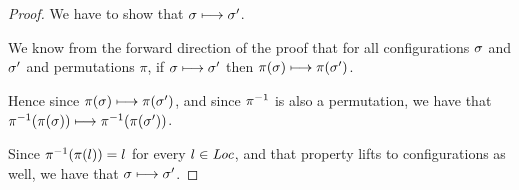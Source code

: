 \begin{proof}
  We have to show that $\sigma \longmapsto \sigma'$.

  We know from the forward direction of the proof that for all
  configurations $\sigma$ and $\sigma'$ and permutations $\pi$, if
  $\sigma \longmapsto \sigma'$ then $\pi(\sigma) \longmapsto
  \pi(\sigma')$.

  Hence since $\pi(\sigma) \longmapsto \pi(\sigma')$, and since $\pi^{-1}$
  is also a permutation, we have that $\pi^{-1}(\pi(\sigma)) \longmapsto
  \pi^{-1}(\pi(\sigma'))$.

  Since $\pi^{-1}(\pi(l)) = l$ for every $l \in \mathit{Loc}$, and that property
  lifts to configurations as well, we have that $\sigma \longmapsto
  \sigma'$.
\end{proof}
